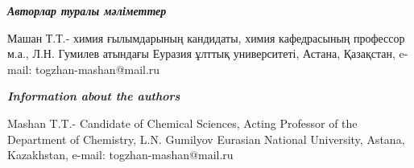 \emph{{\bfseries Авторлар туралы мәліметтер}}

\begin{noparindent}
Машан Т.Т.- химия ғылымдарының кандидаты, химия кафедрасының профессор
м.а., Л.Н. Гумилев атындағы Еуразия ұлттық университеті, Астана,
Қазақстан, e-mail: togzhan-mashan@mail.ru
\end{noparindent}

\emph{{\bfseries Information about the authors}}

\begin{noparindent}
Mashan T.T.- Candidate of Chemical Sciences, Acting Professor of the
Department of Chemistry, L.N. Gumilyov Eurasian National University,
Astana, Kazakhstan, e-mail: togzhan-mashan@mail.ru
\end{noparindent}
